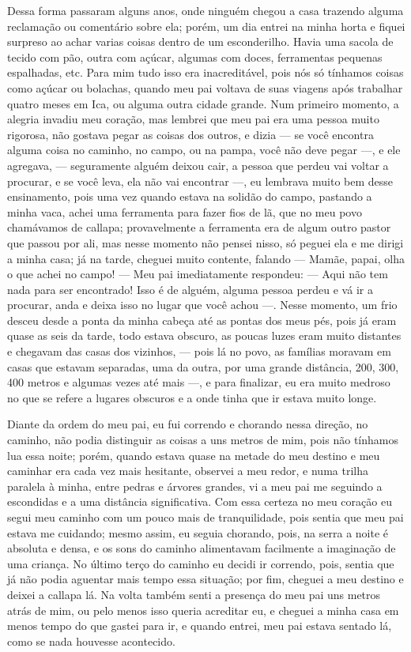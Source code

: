 Dessa forma passaram alguns anos, onde ninguém chegou a casa trazendo alguma reclamação ou comentário sobre ela; porém, um dia entrei na minha horta e  fiquei surpreso ao achar varias coisas dentro de um esconderilho. Havia uma sacola de tecido com pão, outra com açúcar, algumas com doces, ferramentas pequenas espalhadas, etc. 
Para mim tudo isso era inacreditável, pois nós só tínhamos coisas como açúcar ou bolachas, quando meu pai voltava de suas viagens após trabalhar quatro meses em Ica, ou alguma outra cidade grande.
Num primeiro momento, a alegria invadiu meu coração, mas lembrei que meu pai era uma pessoa muito rigorosa, não gostava pegar as coisas dos outros, e dizia --- se você encontra alguma coisa no caminho, no campo, ou na pampa, você não deve pegar ---, e ele agregava, --- seguramente alguém deixou cair, a pessoa que perdeu vai voltar a procurar, e se você leva, ela não vai encontrar ---, 
eu lembrava muito bem desse ensinamento, pois uma vez quando estava na solidão do campo, pastando a minha vaca, achei uma ferramenta para fazer fios de lã, que no meu povo chamávamos de callapa; provavelmente a ferramenta era de algum outro pastor que passou por ali, mas nesse momento não pensei nisso, só peguei ela e me dirigi a minha casa; já na tarde, cheguei  muito contente, falando --- Mamãe, papai, olha o que achei no campo! --- 
Meu pai imediatamente respondeu: --- Aqui não tem nada para ser encontrado! Isso é de alguém, alguma pessoa perdeu e vá ir a procurar, anda e deixa isso no lugar que você achou ---. 
Nesse momento, um frio desceu desde a ponta da minha cabeça até as pontas dos meus pés, pois já eram quase as seis da tarde, todo estava obscuro, as poucas luzes eram muito distantes e chegavam das casas dos vizinhos, --- pois lá no povo, as famílias moravam em casas que estavam separadas, uma da outra, por uma grande distância, 200, 300, 400 metros e algumas vezes até mais  ---, e para finalizar, eu era muito medroso no que se refere a lugares obscuros e a onde tinha que ir estava muito longe.

Diante da ordem do meu pai, eu fui correndo e chorando nessa direção, no caminho, não podia distinguir as coisas a uns metros de mim, pois não tínhamos lua essa noite; porém, quando estava quase na metade do meu destino e meu caminhar era cada vez mais hesitante, observei a meu redor, e numa trilha paralela à minha, entre pedras e árvores grandes, vi a meu pai me seguindo a escondidas e a uma distância significativa.
Com essa certeza no meu coração eu segui meu caminho com um pouco mais de tranquilidade, pois sentia que meu pai estava me cuidando; mesmo assim, eu seguia chorando, pois, na serra a noite é absoluta e densa, e os sons do caminho alimentavam facilmente a imaginação de uma criança.
No último terço do caminho eu decidi ir correndo, pois, sentia que já não podia aguentar mais tempo essa situação; por fim, cheguei a meu destino e deixei a callapa lá.
Na volta também senti a presença do meu pai uns metros atrás de mim, ou pelo menos isso queria acreditar eu, e cheguei a minha casa em menos tempo do que gastei para ir, e quando entrei, meu pai estava sentado lá, como se nada houvesse acontecido.


